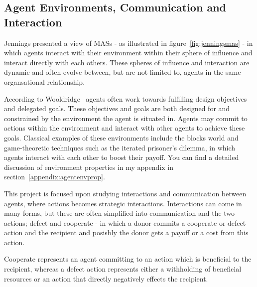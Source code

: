 \documentclass[]{final_report}
\begin{document}
\subsection{Agent Environments, Communication and Interaction}
Jennings presented a view of MASs - as illustrated in figure~\ref{fig:jenningsmas} - in which agents interact with their environment within their sphere of influence and interact directly with each others. These spheres of influence and interaction are dynamic and often evolve between, but are not limited to, agents in the same organsational relationship.\par 
According to Wooldridge~\cite{wooldridge2009introduction} agents often work towards fulfilling design objectives and delegated goals. These objectives and goals are both designed for and constrained by the environment the agent is situated in. Agents may commit to actions within the environment and interact with other agents to achieve these goals. Classical examples of these environments include the blocks world and game-theoretic techniques such as the iterated prisoner's dilemma, in which agents interact with each other to boost their payoff. You can find a detailed discussion of environment properties in my appendix in section~\ref{appendix:agentenvprop}.\par
This project is focused upon studying interactions and communication between agents, where actions becomes strategic interactions. Interactions can come in many forms, but these are often simplified into communication and the two actions; defect and cooperate - in which a donor commits a cooperate or defect action and the recipient and posisbly the donor gets a payoff or a cost from this action.\par  
Cooperate represents an agent committing to an action which is beneficial to the recipient, whereas a defect action represents either a withholding of beneficial resources or an action that directly negatively effects the recipient.\par 
\end{document}
